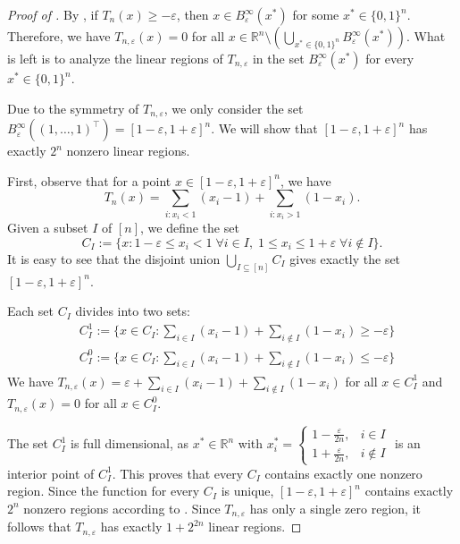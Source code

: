 \documentclass{article}
\begin{document}
\begin{proof}[Proof of ]
By , if $T_n(x)\geq -\varepsilon$, then $x\in B^\infty_\varepsilon(x^*)$ for some $x^*\in \{0,1\}^n$.
Therefore, we have $T_{n,\varepsilon}(x) = 0$ for all $x\in \mathbb{R}^n\setminus (\bigcup_{x^*\in \{0,1\}^n}B^\infty_\varepsilon(x^*))$.
What is left is to analyze the linear regions of $T_{n,\varepsilon}$ in the set $B^\infty_\varepsilon(x^*)$ for every $x^*\in \{0,1\}^n$.

Due to the symmetry of $T_{n,\varepsilon}$, we only consider the set $B^\infty_\varepsilon((1,\dots, 1)^\top)=[1-\varepsilon,1+\varepsilon]^n$.
We will show that $[1-\varepsilon,1+\varepsilon]^n$ has exactly $2^n$ nonzero linear regions.

First, observe that for a point $x\in [1-\varepsilon,1+\varepsilon]^n$, we have
\[
T_n(x)= \sum_{i: x_i< 1}(x_i-1)+\sum_{i: x_i>1}(1-x_i).
\]
Given a subset $I$ of $[n]$, we define the set
\[
C_I:=\{x: 1-\varepsilon\leq x_i< 1 \;\forall i\in I,\;
1\leq x_i\leq 1+\varepsilon\;\forall i\notin I\}.
\]
It is easy to see that the disjoint union $\bigcup_{I\subseteq [n]}C_I$ gives exactly the set $[1-\varepsilon,1+\varepsilon]^n$.

Each set $C_I$ divides into two sets:
\begin{align*}
    &C^1_I:=\{x\in C_I: \sum_{i\in I}(x_i-1)+\sum_{i\notin I}(1-x_i)\geq-\varepsilon\}\\
    &C^0_I:=\{x\in C_I: \sum_{i\in I}(x_i-1)+\sum_{i\notin I}(1-x_i)\leq-\varepsilon\}
\end{align*}
We have $T_{n,\varepsilon}(x)=\varepsilon+\sum_{i\in I}(x_i-1)+\sum_{i\notin I}(1-x_i)$ for all $x\in C^1_I$ and $T_{n,\varepsilon}(x)=0$ for all $x\in C^0_I$.

The set $C^1_I$ is full dimensional, as $x^*\in \mathbb{R}^n$ with
$x^*_i=\begin{cases}
1-\frac{\varepsilon}{2n},&i\in I\\
1+\frac{\varepsilon}{2n},&i\notin I
\end{cases}$ is an interior point of $C^1_I$.
This proves that every $C_I$ contains exactly one nonzero region. Since the function for every $C_I$ is unique, $[1-\varepsilon,1+\varepsilon]^n$ contains exactly $2^n$ nonzero regions according to .
Since $T_{n,\varepsilon}$ has only a single zero region, it follows that $T_{n,\varepsilon}$ has exactly $1+2^{2n}$ linear regions.
\end{proof}
\end{document}
